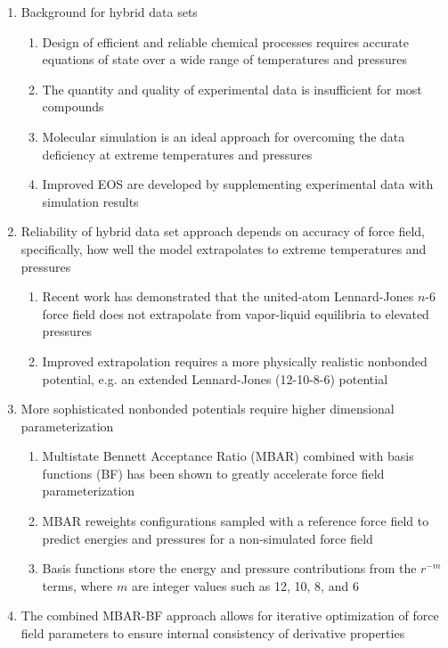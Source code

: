 \documentclass[11pt,a4paper]{article}
\begin{document}
\begin{enumerate}
	\item Background for hybrid data sets
	\begin{enumerate}
		\item Design of efficient and reliable chemical processes requires accurate equations of state over a wide range of temperatures and pressures
		\item The quantity and quality of experimental data is insufficient for most compounds
		\item Molecular simulation is an ideal approach for overcoming the data deficiency at extreme temperatures and pressures
		\item Improved EOS are developed by supplementing experimental data with simulation results
	\end{enumerate}
	\item Reliability of hybrid data set approach depends on accuracy of force field, specifically, how well the model extrapolates to extreme temperatures and pressures
	\begin{enumerate}
		\item Recent work has demonstrated that the united-atom Lennard-Jones $n$-6 force field does not extrapolate from vapor-liquid equilibria to elevated pressures
		\item Improved extrapolation requires a more physically realistic nonbonded potential, e.g. an extended Lennard-Jones (12-10-8-6) potential
	\end{enumerate}
	\item More sophisticated nonbonded potentials require higher dimensional parameterization
	\begin{enumerate}
		\item Multistate Bennett Acceptance Ratio (MBAR) combined with basis functions (BF) has been shown to greatly accelerate force field parameterization
		\item MBAR reweights configurations sampled with a reference force field to predict energies and pressures for a non-simulated force field
		\item Basis functions store the energy and pressure contributions from the $r^{-m}$ terms, where $m$ are integer values such as 12, 10, 8, and 6
	\end{enumerate}
	\item The combined MBAR-BF approach allows for iterative optimization of force field parameters to ensure internal consistency of derivative properties
	
\end{enumerate}
\end{document}
